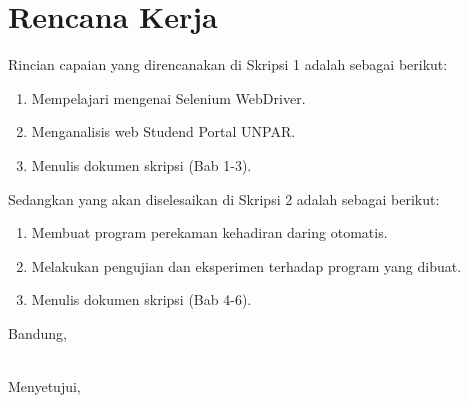 \documentclass[a4paper,twoside]{article}
\begin{document}
\section{Rencana Kerja}
Rincian capaian yang direncanakan di Skripsi 1 adalah sebagai berikut:
\begin{enumerate}
\item Mempelajari mengenai Selenium WebDriver.
\item Menganalisis web Studend Portal UNPAR.
\item Menulis dokumen skripsi (Bab 1-3).
\end{enumerate}

Sedangkan yang akan diselesaikan di Skripsi 2 adalah sebagai berikut:
\begin{enumerate}
\item Membuat program perekaman kehadiran daring otomatis.
\item Melakukan pengujian dan eksperimen terhadap program yang dibuat.
\item Menulis dokumen skripsi (Bab 4-6).
\end{enumerate}

\vspace{0.05cm} %
\centering Bandung, \tanggal\\
\vspace{2cm} \nama \\ 
\vspace{1cm}

Menyetujui, \\
\end{document}
